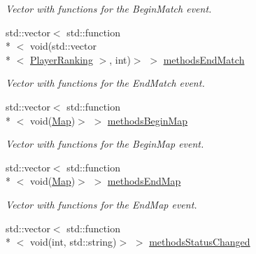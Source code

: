 \begin{DoxyCompactItemize}
\begin{DoxyCompactList}\small\item\em Vector with functions for the Begin\-Match event. \end{DoxyCompactList}\item 
\hypertarget{classEventManager_a57c6a54084081b1ea74736e30ad2e7cc}{std\-::vector$<$ std\-::function\\*
$<$ void(std\-::vector\\*
$<$ \hyperlink{structPlayerRanking}{Player\-Ranking} $>$, int)$>$ $>$ \hyperlink{classEventManager_a57c6a54084081b1ea74736e30ad2e7cc}{methods\-End\-Match}}\label{classEventManager_a57c6a54084081b1ea74736e30ad2e7cc}

\begin{DoxyCompactList}\small\item\em Vector with functions for the End\-Match event. \end{DoxyCompactList}\item 
\hypertarget{classEventManager_a7aa0f06399cd3927d85603b58cfef173}{std\-::vector$<$ std\-::function\\*
$<$ void(\hyperlink{structMap}{Map})$>$ $>$ \hyperlink{classEventManager_a7aa0f06399cd3927d85603b58cfef173}{methods\-Begin\-Map}}\label{classEventManager_a7aa0f06399cd3927d85603b58cfef173}

\begin{DoxyCompactList}\small\item\em Vector with functions for the Begin\-Map event. \end{DoxyCompactList}\item 
\hypertarget{classEventManager_abf91c3327317273584e1a60d8a68ca6e}{std\-::vector$<$ std\-::function\\*
$<$ void(\hyperlink{structMap}{Map})$>$ $>$ \hyperlink{classEventManager_abf91c3327317273584e1a60d8a68ca6e}{methods\-End\-Map}}\label{classEventManager_abf91c3327317273584e1a60d8a68ca6e}

\begin{DoxyCompactList}\small\item\em Vector with functions for the End\-Map event. \end{DoxyCompactList}\item 
\hypertarget{classEventManager_affc955af43afb14a3b950a3cd30b4972}{std\-::vector$<$ std\-::function\\*
$<$ void(int, std\-::string)$>$ $>$ \hyperlink{classEventManager_affc955af43afb14a3b950a3cd30b4972}{methods\-Status\-Changed}}\label{classEventManager_affc955af43afb14a3b950a3cd30b4972}


\end{DoxyCompactItemize}

